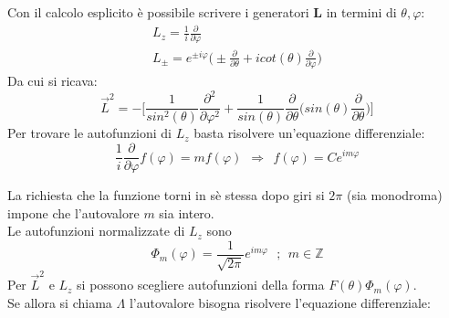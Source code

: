 \documentclass[twoside]{article}
\renewcommand{\vec}[1]{\textbf{#1}}
\begin{document}
Con il calcolo esplicito è possibile scrivere i generatori $\vec{L}$ in termini di $\theta,\varphi$:
\begin{equation}
    \begin{array}{lr}
         L_z=\frac{1}{i}\frac{\partial}{\partial \varphi}  \\
         L_{\pm}=e^{\pm i \varphi}\biggl( \pm \frac{\partial}{\partial \theta}+i cot(\theta) \frac{\partial}{\partial \varphi} \biggr) 
    \end{array}
\end{equation}
Da cui si ricava:
\begin{equation}
    \Vec{L}^2=-\biggl[ \frac{1}{sin^2(\theta)}\frac{\partial^2}{\partial \varphi^2}+\frac{1}{sin(\theta)}\frac{\partial}{\partial \theta}\biggl( sin(\theta)\frac{\partial}{\partial \theta} \biggr) \biggr]
\end{equation}
Per trovare le autofunzioni di $L_z$ basta risolvere un'equazione differenziale:
\begin{equation}
    \frac{1}{i}\frac{\partial}{\partial \varphi}f(\varphi)=mf(\varphi) \ \ \Rightarrow \ \ f(\varphi)=Ce^{im\varphi}
\end{equation}

La richiesta che la funzione torni in sè stessa dopo giri si $2\pi$ (sia monodroma) impone che l'autovalore $m$ sia intero.
\\
Le autofunzioni normalizzate di $L_z$ sono
\begin{equation}
    \Phi_m(\varphi)=\frac{1}{\sqrt{2\pi}}e^{im\varphi} \ \ \ ; \ \ m \in \mathds{Z}
\end{equation}
Per $\Vec{L}^2$ e $L_z$ si possono scegliere autofunzioni della forma $F(\theta)\Phi_m(\varphi)$.
\\
Se allora si chiama $\Lambda$ l'autovalore bisogna risolvere l'equazione differenziale:
\end{document}
